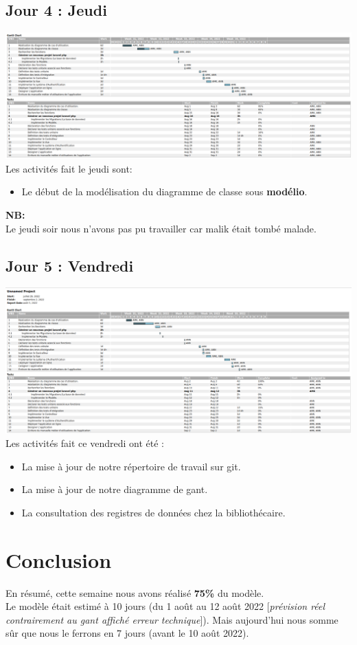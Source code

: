 \documentclass[12pt,a4paper]{article}
\begin{document}
\subsection{Jour 4 : Jeudi}
\includegraphics[scale=0.23]{images/jour4.png}
Les activités fait le jeudi sont:
\begin{itemize}
\item Le début de la modélisation du diagramme de classe sous \textbf{modélio}.
\end{itemize}

\textbf{NB:}\\
Le jeudi soir nous n'avons pas pu travailler car malik était tombé malade.

\subsection{Jour 5 : Vendredi}
\includegraphics[scale=0.23]{images/jour5.png}
Les activités fait ce vendredi ont été :
\begin{itemize}
\item La mise à jour de notre répertoire de travail sur git.
\item La mise à jour de notre diagramme de gant.
\item La consultation des registres de données chez la bibliothécaire.
\end{itemize}
\section{Conclusion}
	En résumé, cette semaine nous avons réalisé \textbf{75\%} du modèle.\\
	Le modèle était estimé à 10 jours (du 1 août au 12 août 2022 [\textit{prévision réel contrairement au gant affiché erreur technique}]). Mais aujourd'hui nous somme sûr que nous le ferrons en 7 jours (avant le 10 août 2022).
\end{document}
